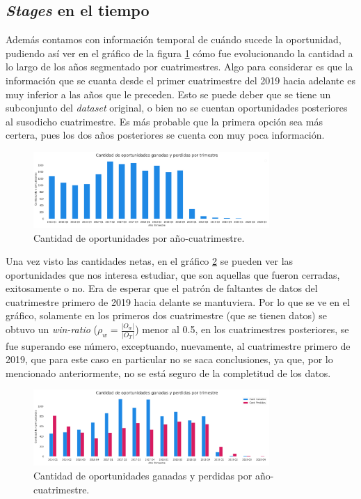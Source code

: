 \documentclass[titlepage,a4paper]{article}
\begin{document}
\subsection{\textit{Stages} en el tiempo}
Además contamos con información temporal de cuándo sucede la oportunidad, pudiendo así ver en el gráfico de la figura \ref{fig:bp_cantidad_de_oportunidades_por_cuatrimestre} cómo fue evolucionando la cantidad a lo largo de los años segmentado por cuatrimestres. Algo para considerar es que la información que se cuanta desde el primer cuatrimestre del 2019 hacia adelante es muy inferior a las años que le preceden. Esto se puede deber que se tiene un subconjunto del \textit{dataset} original, o bien no se cuentan oportunidades posteriores al susodicho cuatrimestre. Es más probable que la primera opción sea más certera, pues los dos años posteriores se cuenta con muy poca información.

\begin{figure}[H]
\centering
\includegraphics[width=0.8\textwidth]{images/bp_cantidad_de_oportunidades_por_cuatrimestre.png}
\cprotect\caption{\label{fig:bp_cantidad_de_oportunidades_por_cuatrimestre}Cantidad de oportunidades por año-cuatrimestre. }
\end{figure}

Una vez visto las cantidades netas, en el gráfico \ref{fig:bp_oportunidades_ganadas_y_perdidas_por_cuatrimestre} se pueden ver las oportunidades que nos interesa estudiar, que son aquellas que fueron cerradas, exitosamente o no. Era de esperar que el patrón de faltantes de datos del cuatrimestre primero de 2019 hacia delante se mantuviera. Por lo que se ve en el gráfico, solamente en los primeros dos cuatrimestre (que se tienen datos) se obtuvo un \textit{win-ratio} ($\rho_w = \frac{|O_w|}{|O_T|}$) menor al 0.5, en los cuatrimestres posteriores, se fue superando ese número, exceptuando, nuevamente, al cuatrimestre primero de 2019, que para este caso en particular no se saca conclusiones, ya que, por lo mencionado anteriormente, no se está seguro de la completitud de los datos.

\begin{figure}[H]
\centering
\includegraphics[width=0.8\textwidth]{images/bp_oportunidades_ganadas_y_perdidas_por_cuatrimestre.png}
\cprotect\caption{\label{fig:bp_oportunidades_ganadas_y_perdidas_por_cuatrimestre} Cantidad de oportunidades ganadas y perdidas por año-cuatrimestre. }
\end{figure}
\end{document}
